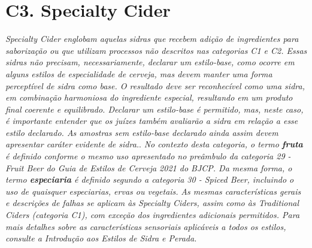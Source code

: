 \section*{C3. Specialty Cider}
\textit{Specialty Cider englobam aquelas sidras que recebem adição de ingredientes para saborização ou que utilizam processos não descritos nas categorias C1 e C2. Essas sidras não precisam, necessariamente, declarar um estilo-base, como ocorre em alguns estilos de especialidade de cerveja, mas devem manter uma forma perceptível de sidra como base. O resultado deve ser reconhecível como uma sidra, em combinação harmoniosa do ingrediente especial, resultando em um produto final coerente e equilibrado. Declarar um estilo-base é permitido, mas, neste caso, é importante entender que os juízes também avaliarão a sidra em relação a esse estilo declarado. As amostras sem estilo-base declarado ainda assim devem apresentar caráter evidente de sidra.}.
\textit{No contexto desta categoria, o termo \textbf{fruta} é definido conforme o mesmo uso apresentado no preâmbulo da categoria 29 - Fruit Beer do Guia de Estilos de Cerveja 2021 do BJCP. Da mesma forma, o termo \textbf{especiaria} é definido segundo a categoria 30 - Spiced Beer, incluindo o uso de quaisquer especiarias, ervas ou vegetais.}
\textit{As mesmas características gerais e descrições de falhas se aplicam às Specialty Ciders, assim como às Traditional Ciders (categoria C1), com exceção dos ingredientes adicionais permitidos. Para mais detalhes sobre as características sensoriais aplicáveis a todos os estilos, consulte a Introdução aos Estilos de Sidra e Perada.}
